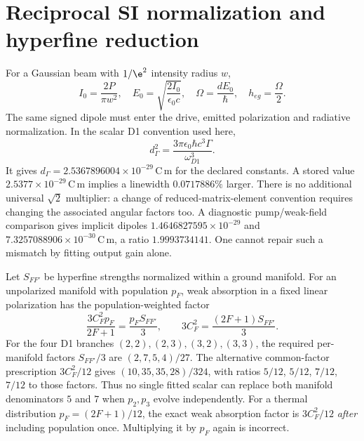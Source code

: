 \section{Reciprocal SI normalization and hyperfine reduction}
\label{sec:gc-normalization}

For a Gaussian beam with $1/\e^2$ intensity radius $w$,
\begin{equation}
 I_0=\frac{2P}{\pi w^2},\quad
 E_0=\sqrt{\frac{2I_0}{\epsilon_0c}},\quad
 \Omega=\frac{dE_0}{\hbar},\quad h_{eg}=\frac{\Omega}{2}.
 \label{eq:gc-si-drive}
\end{equation}
The same signed dipole must enter the drive, emitted polarization and
radiative normalization. In the scalar D1 convention used here,
\begin{equation}
 d_\Gamma^2=\frac{3\pi\epsilon_0\hbar c^3\Gamma}{\omega_{D1}^3}.
 \label{eq:gc-dipole-linewidth}
\end{equation}
It gives $d_\Gamma=2.5367896004\times10^{-29}\,\mathrm{C\,m}$ for the
declared constants. A stored value $2.5377\times10^{-29}\,\mathrm{C\,m}$
implies a linewidth $0.0717886\%$ larger. There is no additional universal
$\sqrt2$ multiplier: a change of reduced-matrix-element convention requires
changing the associated angular factors too. A diagnostic pump/weak-field
comparison gives implicit dipoles $1.4646827595\times10^{-29}$ and
$7.3257088906\times10^{-30}\,\mathrm{C\,m}$, a ratio $1.9993734141$.
One cannot repair such a mismatch by fitting output gain alone.

Let $S_{FF'}$ be hyperfine strengths normalized within a ground manifold.
For an unpolarized manifold with population $p_F$, weak absorption in a fixed
linear polarization has the population-weighted factor
\begin{equation}
 \frac{3C_F^2p_F}{2F+1}=\frac{p_FS_{FF'}}{3},
 \qquad 3C_F^2=\frac{(2F+1)S_{FF'}}{3}.
 \label{eq:gc-manifold-strength}
\end{equation}
For the four D1 branches $(2,2),(2,3),(3,2),(3,3)$, the required per-manifold
factors $S_{FF'}/3$ are $(2,7,5,4)/27$. The alternative common-factor
prescription $3C_F^2/12$ gives $(10,35,35,28)/324$, with ratios $5/12$,
$5/12$, $7/12$, $7/12$ to those factors. Thus no single fitted scalar can
replace both manifold denominators $5$ and $7$ when $p_2,p_3$ evolve
independently. For a thermal distribution $p_F=(2F+1)/12$, the exact weak
absorption factor is $3C_F^2/12$ \emph{after} including population once.
Multiplying it by $p_F$ again is incorrect.


